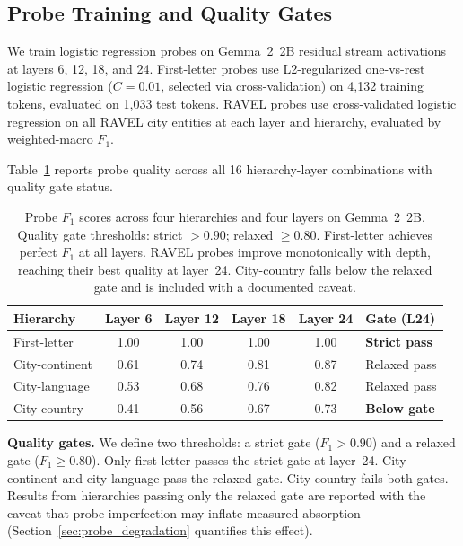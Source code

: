 \documentclass{article}
\begin{document}
\subsection{Probe Training and Quality Gates}

We train logistic regression probes on Gemma~2~2B residual stream activations at layers 6, 12, 18, and 24. First-letter probes use L2-regularized one-vs-rest logistic regression ($C = 0.01$, selected via cross-validation) on 4,132 training tokens, evaluated on 1,033 test tokens. RAVEL probes use cross-validated logistic regression on all RAVEL city entities at each layer and hierarchy, evaluated by weighted-macro $F_1$.

Table~\ref{tab:probe_quality} reports probe quality across all 16 hierarchy-layer combinations with quality gate status.

\begin{table}[t]
\caption{Probe $F_1$ scores across four hierarchies and four layers on Gemma~2~2B. Quality gate thresholds: strict $> 0.90$; relaxed $\geq 0.80$. First-letter achieves perfect $F_1$ at all layers. RAVEL probes improve monotonically with depth, reaching their best quality at layer~24. City-country falls below the relaxed gate and is included with a documented caveat.}
\label{tab:probe_quality}
\centering
\begin{tabular}{lccccl}
\toprule
Hierarchy & Layer 6 & Layer 12 & Layer 18 & Layer 24 & Gate (L24) \\
\midrule
First-letter    & 1.00 & 1.00 & 1.00 & 1.00 & \textbf{Strict pass} \\
City-continent  & 0.61 & 0.74 & 0.81 & 0.87 & Relaxed pass \\
City-language   & 0.53 & 0.68 & 0.76 & 0.82 & Relaxed pass \\
City-country    & 0.41 & 0.56 & 0.67 & 0.73 & \textbf{Below gate} \\
\bottomrule
\end{tabular}
\end{table}

\textbf{Quality gates.} We define two thresholds: a strict gate ($F_1 > 0.90$) and a relaxed gate ($F_1 \geq 0.80$). Only first-letter passes the strict gate at layer~24. City-continent and city-language pass the relaxed gate. City-country fails both gates. Results from hierarchies passing only the relaxed gate are reported with the caveat that probe imperfection may inflate measured absorption (Section~\ref{sec:probe_degradation} quantifies this effect).
\end{document}
